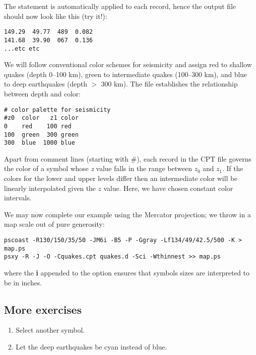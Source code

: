 \documentclass{report}
\begin{document}
The  statement is automatically applied to each record,
hence the output file  should now look like this (try it!):

{\small\begin{verbatim}
149.29  49.77  489  0.082
141.68  39.90  067  0.136
...etc etc
\end{verbatim}
}

We will follow conventional color schemes for seismicity and assign red
to shallow quakes (depth 0--100 km), green to intermediate quakes
(100--300 km), and blue to deep earthquakes (depth $>$ 300 km).  The
 file establishes the relationship between depth
and color:

{\small\begin{verbatim}
# color palette for seismicity
#z0  color   z1 color
0    red    100 red
100  green  300 green
300  blue  1000 blue
\end{verbatim}
}

Apart from comment lines (starting with \#), each record in the CPT file
governs the color of a symbol whose \emph{z} value falls in the range between
$z_0$ and $z_1$.  If the colors for the lower and upper levels differ
then an intermediate color will be linearly interpolated given the $z$
value.  Here, we have chosen constant color intervals.

We may now complete our example using the Mercator projection; we throw in a
map scale out of pure generosity:

{\small\begin{verbatim} 
pscoast -R130/150/35/50 -JM6i -B5 -P -Ggray -Lf134/49/42.5/500 -K > map.ps
psxy -R -J -O -Cquakes.cpt quakes.d -Sci -Wthinnest >> map.ps
\end{verbatim}
}

\noindent
where the \textbf{i} appended to the  option ensures that symbols
sizes are interpreted to be in inches.
\subsection{More exercises}

\begin{enumerate}

\item Select another symbol.

\item Let the deep earthquakes be cyan instead of blue.

\end{enumerate}
\end{document}
